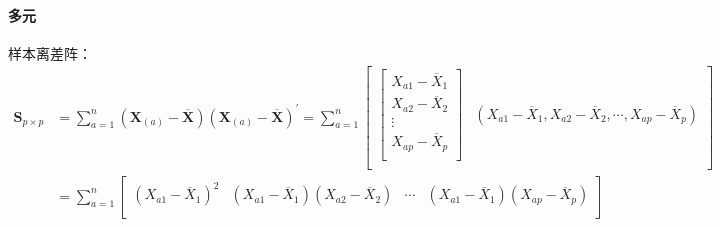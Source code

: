 \documentclass[12pt]{book}
\begin{document}
\paragraph{多元}
样本离差阵：
\begin{align*}

    \mathbf{S}_{p\times p}
     & = \sum_{a=1}^{n}{\left(\mathbf{X}_{\left(a\right)}-\overline{\mathbf{X}}\right)\left(\mathbf{X}_{\left(a\right)}-\overline{\mathbf{X}}\right)^\prime}
    = \sum_{a=1}^{n}
    \begin{bmatrix}
        \begin{bmatrix}
            X_{a1}-{\overline{X}}_1 \\
            X_{a2}-{\overline{X}}_2 \\
            \vdots             \\
            X_{ap}-{\overline{X}}_p \\
        \end{bmatrix}
         & \left(X_{a1}-{\overline{X}}_1,X_{a2}-{\overline{X}}_2,\cdots,X_{ap}-{\overline{X}}_p\right) \\
    \end{bmatrix}                                                                                                                              \\
     & = \sum_{a=1}^{n}
    \begin{bmatrix}
        \left(X_{a1}-{\overline{X}}_1\right)^2
         & \left(X_{a1}-{\overline{X}}_1\right)\left(X_{a2}-{\overline{X}}_2\right)
         & \cdots
         & \left(X_{a1}-{\overline{X}}_1\right)\left(X_{ap}-{\overline{X}}_p\right) \\


\end{bmatrix}
\end{align*}
\end{document}
